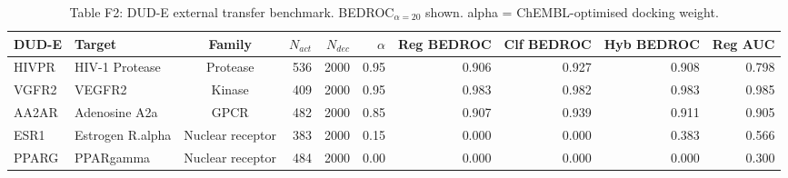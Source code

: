 \begin{table}[ht]
\caption{Table F2: DUD-E external transfer benchmark. BEDROC$_{\alpha=20}$ shown. alpha = ChEMBL-optimised docking weight.}
\label{tab:dude}
\centering\small
\begin{tabular}{llcrrrrrrr}
\toprule
DUD-E & Target & Family & $N_{act}$ & $N_{dec}$ & $\alpha$ & Reg BEDROC & Clf BEDROC & Hyb BEDROC & Reg AUC \\
\midrule
HIVPR & HIV-1 Protease & Protease & 536 & 2000 & 0.95 & 0.906 & 0.927 & 0.908 & 0.798 \\
VGFR2 & VEGFR2 & Kinase & 409 & 2000 & 0.95 & 0.983 & 0.982 & 0.983 & 0.985 \\
AA2AR & Adenosine A2a & GPCR & 482 & 2000 & 0.85 & 0.907 & 0.939 & 0.911 & 0.905 \\
ESR1 & Estrogen R.alpha & Nuclear receptor & 383 & 2000 & 0.15 & 0.000 & 0.000 & 0.383 & 0.566 \\
PPARG & PPARgamma & Nuclear receptor & 484 & 2000 & 0.00 & 0.000 & 0.000 & 0.000 & 0.300 \\
\bottomrule
\end{tabular}
\end{table}
